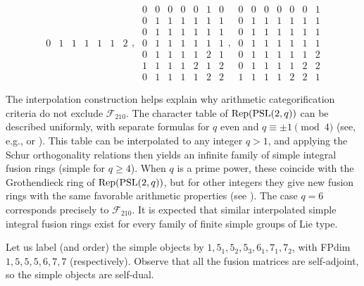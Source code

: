 \documentclass{amsart}
\begin{document}
$${\begin{smallmatrix}
0 & 1 & 1 & 1& 1& 1& 2
\end{smallmatrix} , \
\begin{smallmatrix}
0 & 0 & 0 & 0& 0& 1& 0 \\
0 & 1 & 1 & 1& 1& 1& 1 \\
0 & 1 & 1 & 1& 1& 1& 1 \\
0 & 1 & 1 & 1& 1& 1& 1 \\
0 & 1 & 1 & 1& 1& 2& 1 \\
1 & 1 & 1 & 1& 2& 1& 2 \\
0 & 1 & 1 & 1& 1& 2& 2
\end{smallmatrix} , \
\begin{smallmatrix}
0 & 0 & 0 & 0& 0& 0& 1 \\
0 & 1 & 1 & 1& 1& 1& 1 \\
0 & 1 & 1 & 1& 1& 1& 1 \\
0 & 1 & 1 & 1& 1& 1& 1 \\
0 & 1 & 1 & 1& 1& 1& 2 \\
0 & 1 & 1 & 1& 1& 2& 2 \\
1 & 1 & 1 & 1& 2& 2& 1
\end{smallmatrix}}$$

\begin{remark} \label{rk:interpolated}
The interpolation construction helps explain why arithmetic categorification criteria do not exclude $\mathcal{F}_{210}$. The character table of $\mathrm{Rep}(\mathrm{PSL}(2,q))$ can be described uniformly, with separate formulas for $q$ even and $q\equiv\pm1\pmod4$ (see, e.g., \cite[\S 5.2]{FuHa} or \cite[\S 12.5]{DiMi}). This table can be interpolated to any integer $q>1$, and applying the Schur orthogonality relations then yields an infinite family of simple integral fusion rings (simple for $q \ge 4$). When $q$ is a prime power, these coincide with the Grothendieck ring of $\mathrm{Rep}(\mathrm{PSL}(2,q))$, but for other integers they give new fusion rings with the same favorable arithmetic properties (see \cite{LPRinter}). The case $q=6$ corresponds precisely to $\mathcal{F}_{210}$. It is expected that similar interpolated simple integral fusion rings exist for every family of finite simple groups of Lie type.
\end{remark}

Let us label (and order) the simple objects by $1, 5_1, 5_2, 5_3, 6_1, 7_1, 7_2$, with FPdim $1,5,5,5,6,7,7$ (respectively). Observe that all the fusion matrices are self-adjoint, so the simple objects are self-dual.
\end{document}
